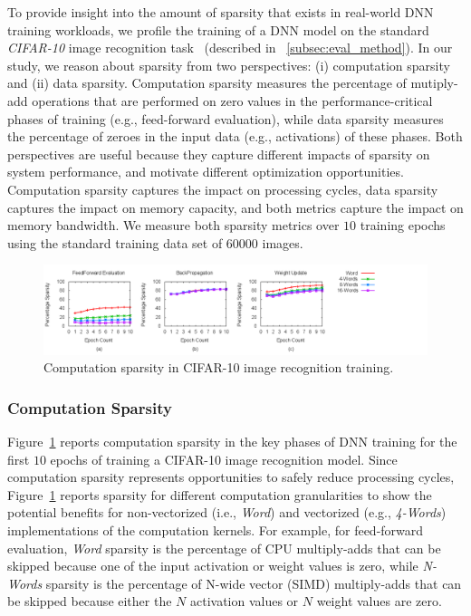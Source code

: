 To provide insight into the amount of sparsity that exists in real-world DNN training workloads, we profile the training of a DNN model on the standard {\it CIFAR-10} image recognition task~\cite{KrizhevskyThesis} (described in ~\ref{subsec:eval_method}).  In our study, we reason about sparsity from two perspectives: (i) computation sparsity and (ii)  data sparsity.  Computation sparsity measures the percentage of mutiply-add operations that are performed on zero values in the performance-critical phases of training (e.g., feed-forward evaluation), while data sparsity measures the percentage of zeroes in the input data (e.g., activations) of these phases.  Both perspectives are useful because they capture different impacts of sparsity on system performance, and motivate different optimization opportunities.  Computation sparsity captures the impact on processing cycles, data sparsity captures the impact on memory capacity, and both metrics capture the impact on memory bandwidth.  We measure both sparsity metrics over $10$ training epochs using the standard training data set of $60000$ images. 

\begin{figure}
 \centering
 \includegraphics[width=1.9\columnwidth]{Figures/multi_computesparsity.png}
\caption{Computation sparsity in CIFAR-10 image recognition training.}
 \label{fig:cifar-10_compute_sparsity}
 \end{figure}
 
\subsubsection{Computation Sparsity}
\label{subsec:computation_sparsity}
 Figure~\ref{fig:cifar-10_compute_sparsity} reports computation sparsity in the key phases of DNN training for the first $10$ epochs of training a CIFAR-10 image recognition model.  Since computation sparsity represents opportunities to safely reduce processing cycles, Figure~\ref{fig:cifar-10_compute_sparsity} reports sparsity for different computation granularities to show the potential benefits for non-vectorized (i.e., {\it Word}) and vectorized (e.g., {\it 4-Words}) implementations of the computation kernels.  For example, for feed-forward evaluation, {\it Word} sparsity is the percentage of CPU multiply-adds that can be skipped because one of the input activation or weight values is zero, while {\it N-Words} sparsity is the percentage of N-wide vector (SIMD) multiply-adds that can be skipped because either the $N$ activation values or $N$ weight values are zero. 
 
